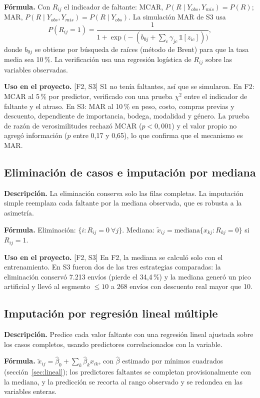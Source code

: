 \documentclass[11pt,a4paper]{article}
\newcommand{\desc}{\textbf{Descripción.} }
\newcommand{\formula}{\textbf{Fórmula.} }
\newcommand{\uso}{\textbf{Uso en el proyecto.} }
\newcommand{\fase}[1]{{\footnotesize\color{gris}[#1]}}
\begin{document}
\formula Con $R_{ij}$ el indicador de faltante: MCAR, $P(R\mid Y_{obs},Y_{mis})=P(R)$; MAR, $P(R\mid Y_{obs},Y_{mis})=P(R\mid Y_{obs})$. La simulación MAR de S3 usa
\[
P(R_{ij}=1)=\frac1{1+\exp\!\big(-(b_{0j}+\sum_c \gamma_{jc}\,\mathbb 1[z_{ic}])\big)},
\]
donde $b_{0j}$ se obtiene por búsqueda de raíces (método de Brent) para que la tasa media sea 10\,\%. La verificación usa una regresión logística de $R_{ij}$ sobre las variables observadas.

\uso \fase{F2, S3} S1 no tenía faltantes, así que se simularon. En F2: MCAR al 5\,\% por predictor, verificado con una prueba $\chi^2$ entre el indicador de faltante y el atraso. En S3: MAR al 10\,\% en peso, costo, compras previas y descuento, dependiente de importancia, bodega, modalidad y género. La prueba de razón de verosimilitudes rechazó MCAR ($p<0{,}001$) y el valor propio no agregó información ($p$ entre 0,17 y 0,65), lo que confirma que el mecanismo es MAR.

\subsection{Eliminación de casos e imputación por mediana}
\desc La eliminación conserva solo las filas completas. La imputación simple reemplaza cada faltante por la mediana observada, que es robusta a la asimetría.

\formula Eliminación: $\{i: R_{ij}=0\ \forall j\}$. Mediana: $\tilde x_{ij}=\mathrm{mediana}\{x_{kj}:R_{kj}=0\}$ si $R_{ij}=1$.

\uso \fase{F2, S3} En F2, la mediana se calculó solo con el entrenamiento. En S3 fueron dos de las tres estrategias comparadas: la eliminación conservó 7.213 envíos (pierde el 34,4\,\%) y la mediana generó un pico artificial y llevó al segmento $\le10$ a 268 envíos con descuento real mayor que 10.

\subsection{Imputación por regresión lineal múltiple}
\desc Predice cada valor faltante con una regresión lineal ajustada sobre los casos completos, usando predictores correlacionados con la variable.

\formula $\tilde x_{ij}=\hat\beta_{0}+\sum_k\hat\beta_{k}x_{ik}$, con $\hat\beta$ estimado por mínimos cuadrados (sección~\ref{sec:lineal}); los predictores faltantes se completan provisionalmente con la mediana, y la predicción se recorta al rango observado y se redondea en las variables enteras.
\end{document}
